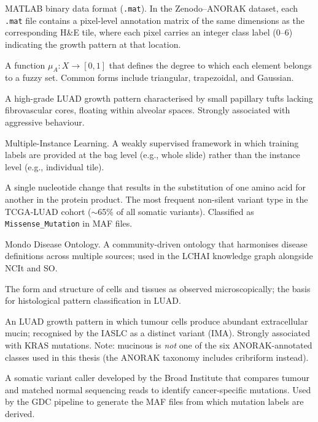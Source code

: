 \begin{description}[style=nextline,leftmargin=4cm]
\item[MAT file] MATLAB binary data format (\texttt{.mat}).  In the Zenodo--ANORAK dataset, each \texttt{.mat} file contains a pixel-level annotation matrix of the same dimensions as the corresponding H\&E tile, where each pixel carries an integer class label (0--6) indicating the growth pattern at that location.


\item[Membership function] A function $\mu_A: X \to [0,1]$ that defines the degree to which each element belongs to a fuzzy set.  Common forms include triangular, trapezoidal, and Gaussian.


\item[Micropapillary pattern] A high-grade LUAD growth pattern characterised by small papillary tufts lacking fibrovascular cores, floating within alveolar spaces.  Strongly associated with aggressive behaviour.


\item[MIL] Multiple-Instance Learning.  A weakly supervised framework in which training labels are provided at the bag level (e.g., whole slide) rather than the instance level (e.g., individual tile).


\item[Missense mutation] A single nucleotide change that results in the substitution of one amino acid for another in the protein product.  The most frequent non-silent variant type in the TCGA-LUAD cohort ($\sim$65\% of all somatic variants).  Classified as \texttt{Missense\_Mutation} in MAF files.


\item[MONDO] Mondo Disease Ontology.  A community-driven ontology that harmonises disease definitions across multiple sources; used in the LCHAI knowledge graph alongside NCIt and SO.


\item[Morphology] The form and structure of cells and tissues as observed microscopically; the basis for histological pattern classification in LUAD.


\item[Mucinous invasive pattern] An LUAD growth pattern in which tumour cells produce abundant extracellular mucin; recognised by the IASLC as a distinct variant (IMA).  Strongly associated with KRAS mutations.  Note: mucinous is \emph{not} one of the six ANORAK-annotated classes used in this thesis (the ANORAK taxonomy includes cribriform instead).


\item[MuTect2] A somatic variant caller developed by the Broad Institute that compares tumour and matched normal sequencing reads to identify cancer-specific mutations.  Used by the GDC pipeline to generate the MAF files from which mutation labels are derived.



\end{description}
